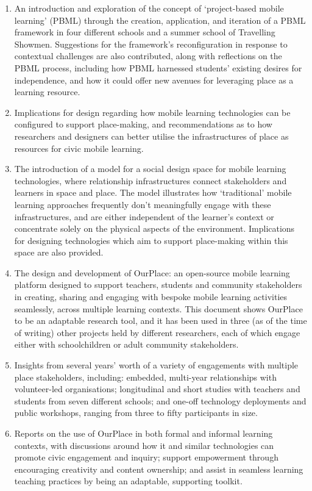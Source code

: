 \begin{enumerate}
    \item An introduction and exploration of the concept of `project-based mobile learning' (PBML) through the creation, application, and iteration of a PBML framework in four different schools and a summer school of Travelling Showmen. Suggestions for the framework's reconfiguration in response to contextual challenges are also contributed, along with reflections on the PBML process, including how PBML harnessed students’ existing desires for independence, and how it could offer new avenues for leveraging place as a learning resource.
    \item Implications for design regarding how mobile learning technologies can be configured to support place-making, and recommendations as to how researchers and designers can better utilise the infrastructures of place as resources for civic mobile learning.
    \item The introduction of a model for a social design space for mobile learning technologies, where relationship infrastructures connect stakeholders and learners in space and place. The model illustrates how `traditional' mobile learning approaches frequently don’t meaningfully engage with these infrastructures, and are either independent of the learner’s context or concentrate solely on the physical aspects of the environment. Implications for designing technologies which aim to support place-making within this space are also provided.
    \item The design and development of OurPlace: an open-source mobile learning platform designed to support teachers, students and community stakeholders in creating, sharing and engaging with bespoke mobile learning activities seamlessly, across multiple learning contexts. This document shows OurPlace to be an adaptable research tool, and it has been used in three (as of the time of writing) other projects held by different researchers, each of which engage either with schoolchildren or adult community stakeholders.
    \item Insights from several years' worth of a variety of engagements with multiple place stakeholders, including: embedded, multi-year relationships with volunteer-led organisations; longitudinal and short studies with teachers and students from seven different schools; and one-off technology deployments and public workshops, ranging from three to fifty participants in size.
    \item Reports on the use of OurPlace in both formal and informal learning contexts, with discussions around how it and similar technologies can promote civic engagement and inquiry; support empowerment through encouraging creativity and content ownership; and assist in seamless learning teaching practices by being an adaptable, supporting toolkit.

\end{enumerate}

